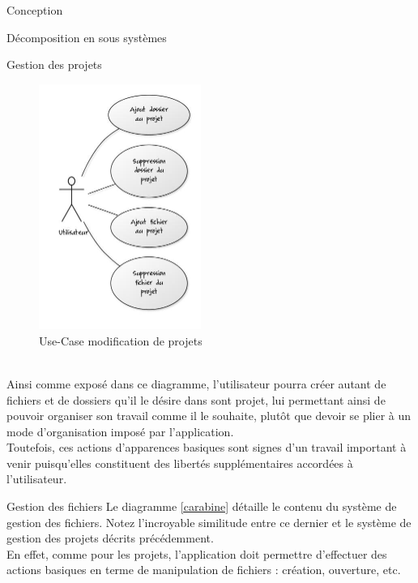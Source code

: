 \documentclass[a4paper, 12pt]{report}
\begin{document}
\begin{part}{Conception}
\begin{chapter}{Décomposition en sous systèmes}
\begin{section}{Gestion des projets}
				\begin{figure}[h]
					\begin{center}
						\includegraphics[height=8cm]{images/modificationProjet.jpg}
						\caption{Use-Case modification de projets}
						\label{ucgp}
					\end{center}
				\end{figure}~\\

				Ainsi comme exposé dans ce diagramme, l'utilisateur pourra créer autant de fichiers et de dossiers qu'il le désire dans 
				sont projet, lui permettant ainsi de pouvoir organiser son travail comme il le souhaite, plutôt que devoir se plier à un 
				mode d'organisation imposé par l'application.\\
				Toutefois, ces actions d'apparences basiques sont signes d'un travail important à venir puisqu'elles constituent des libertés
				supplémentaires	accordées à l'utilisateur.\\
			\end{section}
			\begin{section}{Gestion des fichiers}
				Le diagramme \ref{carabine} détaille le contenu du système de gestion des fichiers. Notez l'incroyable similitude entre ce
				dernier et le système de gestion des projets décrits précédemment.\\
				En effet, comme pour les projets, l'application doit permettre d'effectuer des actions basiques en terme de manipulation de fichiers :
				création, ouverture, etc.\\



\end{section}
\end{chapter}
\end{part}
\end{document}
